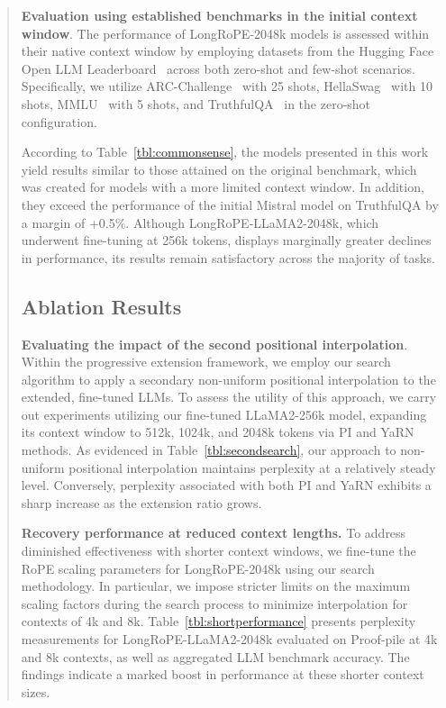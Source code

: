 \begin{abstract}
\textbf{Evaluation using established benchmarks in the initial context window}. The performance of LongRoPE-2048k models is assessed within their native context window by employing datasets from the Hugging Face Open LLM Leaderboard~\cite{huggingfaceboard} across both zero-shot and few-shot scenarios. Specifically, we utilize ARC-Challenge~\cite{allenai:arc} with 25 shots, HellaSwag~\cite{zellers2019hellaswag} with 10 shots, MMLU~\cite{mmlu} with 5 shots, and TruthfulQA~\cite{lin2021truthfulqa} in the zero-shot configuration.

According to Table~\ref{tbl:commonsense}, the models presented in this work yield results similar to those attained on the original benchmark, which was created for models with a more limited context window. In addition, they exceed the performance of the initial Mistral model on TruthfulQA by a margin of +0.5\%. Although LongRoPE-LLaMA2-2048k, which underwent fine-tuning at 256k tokens, displays marginally greater declines in performance, its results remain satisfactory across the majority of tasks.

\subsection{Ablation Results}

\textbf{Evaluating the impact of the second positional interpolation}. Within the progressive extension framework, we employ our search algorithm to apply a secondary non-uniform positional interpolation to the extended, fine-tuned LLMs. To assess the utility of this approach, we carry out experiments utilizing our fine-tuned LLaMA2-256k model, expanding its context window to 512k, 1024k, and 2048k tokens via PI and YaRN methods. As evidenced in Table~\ref{tbl:secondsearch}, our approach to non-uniform positional interpolation maintains perplexity at a relatively steady level. Conversely, perplexity associated with both PI and YaRN exhibits a sharp increase as the extension ratio grows.

\textbf{Recovery performance at reduced context lengths.} To address diminished effectiveness with shorter context windows, we fine-tune the RoPE scaling parameters for LongRoPE-2048k using our search methodology. In particular, we impose stricter limits on the maximum scaling factors during the search process to minimize interpolation for contexts of 4k and 8k. 
 Table~\ref{tbl:shortperformance} presents perplexity measurements for LongRoPE-LLaMA2-2048k evaluated on Proof-pile at 4k and 8k contexts, as well as aggregated LLM benchmark accuracy. The findings indicate a marked boost in performance at these shorter context sizes.


\end{abstract}
